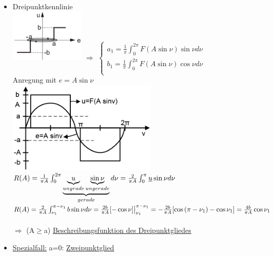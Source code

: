 \documentclass[openany,a4paper,11pt]{book}
\begin{document}
\begin{itemize}
    \item Dreipunktkennlinie\\
    \includegraphics[width=1.4in]{imgs/NLR49.png} $\Rightarrow$ $\left\{ \begin{array}{c}
    a_1=\frac{1}{\pi}\int_{0}^{2\pi}F(A\sin{\nu})\sin{\nu}d\nu\\
    b_1=\frac{1}{\pi}\int_{0}^{2\pi}F(A\sin{\nu})\cos{\nu}d\nu\\
    \end{array} \right.$\\
    Anregung mit $e=A\sin{\nu}$\\
    \includegraphics[width=2.8in]{imgs/NLR50.png}\\
    $R(A)=\frac{1}{\pi A}\int_{0}^{2\pi}\underbrace{\underbrace{u}_{ungrade}\underbrace{\sin{\nu}}_{ungerade}}_{gerade} d\nu=\frac{2}{\pi A}\int_0^{\pi} \uline{u} \sin{\nu} d\nu$\\
    $R(A)=\frac{2}{\pi A}\int_{\nu_1}^{\pi-\nu_1}b\sin{\nu} d\nu \\
    =\frac{2b}{\pi A}[-\cos{\nu}]\big|_{\nu_1}^{\pi-\nu_1}=-\frac{2b}{\pi A}[\cos{(\pi-\nu_1)}-\cos{\nu_1}]=\frac{4b}{\pi A}\cos{\nu_1}$\\
     \quad {}\\
    $\Rightarrow$  (A$\ge$a) \uline{Beschreibungsfunktion des Dreipunktgliedes}
    \item \uline{Spezialfall:} a=0: \uline{Zweipunktglied}\\

\end{itemize}
\end{document}
